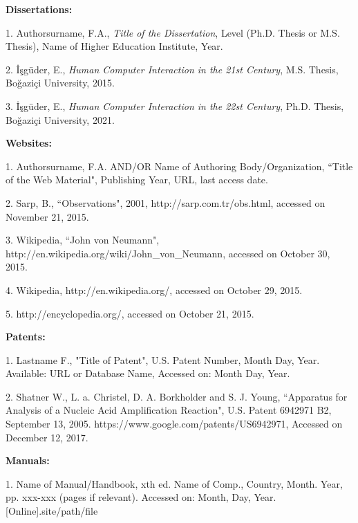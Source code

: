 \documentclass[a4paper,oneside,12pt]{report}
\numberwithin{equation}{chapter}
\begin{document}
\begin{flushleft}
\clearpage
\leftskip 5mm \parindent -5mm \textbf{Dissertations:}

\leftskip 5mm \parindent -5mm 1. Authorsurname, F.A., \textit{Title of the Dissertation}, Level (Ph.D. Thesis or M.S. Thesis), Name of Higher Education Institute, Year.

\leftskip 5mm \parindent -5mm 2. İşgüder, E., \textit{Human Computer Interaction in the 21st Century}, M.S. Thesis, Boğaziçi University, 2015.

\leftskip 5mm \parindent -5mm 3. İşgüder, E., \textit{Human Computer Interaction in the 22st Century}, Ph.D. Thesis, Boğaziçi University, 2021.\newline


\leftskip 5mm \parindent -5mm \textbf{Websites:}

\leftskip 5mm \parindent -5mm 1. Authorsurname, F.A. AND/OR Name of Authoring Body/Organization, ``Title of the Web Material", Publishing Year, URL, last access date.

\leftskip 5mm \parindent -5mm 2. Sarp, B., ``Observations", 2001, http://sarp.com.tr/obs.html, accessed on November 21, 2015.

\leftskip 5mm \parindent -5mm 3. Wikipedia, ``John von Neumann", http://en.wikipedia.org/wiki/John\_von\_Neumann, accessed on October 30, 2015.

\leftskip 5mm \parindent -5mm 4. Wikipedia, http://en.wikipedia.org/, accessed on October 29, 2015.

\leftskip 5mm \parindent -5mm 5. http://encyclopedia.org/, accessed on October 21, 2015.\newline

\clearpage
\leftskip 5mm \parindent -5mm \textbf{Patents:}

\leftskip 5mm \parindent -5mm 1. Lastname F., "Title of Patent", U.S. Patent Number, Month Day, Year. Available: URL or Database Name, Accessed on: Month Day, Year.

\leftskip 5mm \parindent -5mm 2. Shatner W., L. a. Christel, D. A. Borkholder and S. J. Young, ``Apparatus for Analysis of a Nucleic Acid Amplification Reaction", U.S. Patent 6942971 B2, September 13, 2005. https://www.google.com/patents/US6942971, Accessed on December 12, 2017.\newline


\leftskip 5mm \parindent -5mm \textbf{Manuals:}

\leftskip 5mm \parindent -5mm 1. Name of Manual/Handbook, xth ed. Name of Comp.,  Country, Month. Year, pp. xxx-xxx (pages if relevant). Accessed on: Month, Day, Year. [Online].site/path/file 


\end{flushleft}
\end{document}

